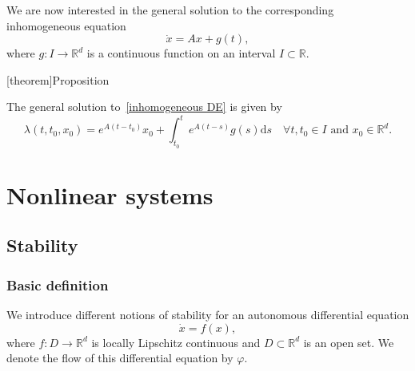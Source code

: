 \documentclass[12pt]{report}
\theoremstyle{definition}
\begin{document}
We are now interested in the general solution to the corresponding inhomogeneous
equation
\begin{equation}\label{inhomogeneous DE}
    \dot{x}=Ax+g(t),
\end{equation} 
where $g:I\rightarrow\mathbb{R}^{d}$ is a continuous function on an interval
$I\subset \mathbb{R}$.

[theorem]{Proposition}
\begin{variation of constants formula}
    The general solution to~\eqref{inhomogeneous DE} is given by
    \[
        \lambda(t,t_0,x_0)=e^{A(t-t_0)}x_0
        + \int_{t_0}^{t} e^{A(t-s)}g(s)\mathrm{d}s
        \quad\forall t,t_0\in I\text{ and }x_0\in\mathbb{R}^{d}.
    \]
\end{variation of constants formula}

\chapter{Nonlinear systems}

\section{Stability}

\subsection{Basic definition}

We introduce different notions of stability for an autonomous differential
equation
\begin{equation}\label{eq:autonomousDE}
    \dot{x}=f(x),
\end{equation} 
where $f:D\rightarrow\mathbb{R}^{d}$ is locally Lipschitz continuous and
$D\subset\mathbb{R}^{d}$ is an open set.
We denote the flow of this differential equation by $\varphi$.
\end{document}
